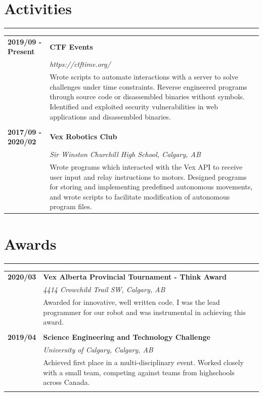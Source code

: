 \documentclass[letterpaper]{article}
\newcommand{\horizontalLine}{%
    \rule{\textwidth}{0.2pt}
    \vspace{1ex}
}
\begin{document}
    \section*{Activities}

        \horizontalLine

        \begin{tabular}{p{} p{}} 
            \textbf{2019/09 - Present} & \large\textbf{CTF Events} \\
            & \emph{https://ctftime.org/} \\
            & Wrote scripts to automate interactions with a server to solve challenges under time constraints.
            Reverse engineered programs through source code or disassembled binaries without symbols.
            Identified and exploited security vulnerabilities in web applications and disassembled binaries. \\
            \\
            \textbf{2017/09 - 2020/02} & \large\textbf{Vex Robotics Club} \\
            & \emph{Sir Winston Churchill High School, Calgary, AB} \\
            & Wrote programs which interacted with the Vex API to receive user input and relay instructions to motors.
            Designed programs for storing and implementing predefined autonomous movements, and wrote scripts to facilitate modification of autonomous program files. \\
        \end{tabular}

    \section*{Awards}

        \horizontalLine

        \begin{tabular}{p{} p{}} 
            \textbf{2020/03} & \large\textbf{Vex Alberta Provincial Tournament - Think Award} \\
            & \emph{4414 Crowchild Trail SW, Calgary, AB} \\
            & Awarded for innovative, well written code.
            I was the lead programmer for our robot and was instrumental in achieving this award. \\
            \\
            \textbf{2019/04} & \large\textbf{Science Engineering and Technology Challenge} \\
            & \emph{University of Calgary, Calgary, AB} \\
            & Achieved first place in a multi-disciplinary event.
            Worked closely with a small team, competing against teams from highschools across Canada. \\
            \\
        \end{tabular}
\end{document}
